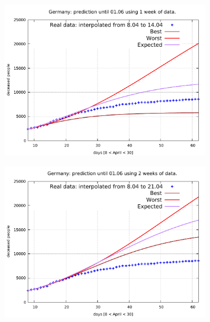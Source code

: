 \documentclass[8pt]{article}
\begin{document}
\begin{figure}[h!]
  \centering
  \begin{subfigure}[b]{0.45\linewidth}
  \includegraphics[width=\linewidth]{../err100p_simulations/de/8-14/8-14.pdf}
  \end{subfigure}
  \begin{subfigure}[b]{0.45\linewidth}
    \includegraphics[width=\linewidth]{../err100p_simulations/de/8-21/8-21.pdf}
  \end{subfigure}
  \begin{subfigure}[b]{0.45\linewidth}

\end{subfigure}
\end{figure}
\end{document}

